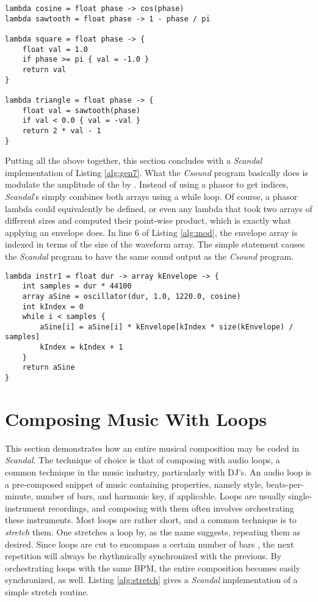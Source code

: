 \begin{lstlisting}[emph={lambda,float,cos,pi,if,return},emphstyle={\textbf},caption={Waveform-generating lambdas.},label={alg:waveforms}]
lambda cosine = float phase -> cos(phase)
lambda sawtooth = float phase -> 1 - phase / pi

lambda square = float phase -> {
	float val = 1.0
	if phase >= pi { val = -1.0 }
	return val
}

lambda triangle = float phase -> {
	float val = sawtooth(phase)
	if val < 0.0 { val = -val }
	return 2 * val - 1
}
\end{lstlisting}

Putting all the above together, this section concludes with a \emph{Scandal} implementation of Listing \ref{alg:gen7}. What the \emph{Csound} program basically does is modulate the amplitude of the  by . Instead of using a phasor to get indices, \emph{Scandal}'s  simply combines both arrays using a while loop. Of course, a phasor lambda could equivalently be defined, or even any lambda that took two arrays of different sizes and computed their point-wise product, which is exactly what applying an envelope does. In line 6 of Listing \ref{alg:mod}, the envelope array is indexed in terms of the size of the waveform array. The simple statement  causes the \emph{Scandal} program to have the same sound output as the \emph{Csound} program.

\begin{lstlisting}[emph={lambda,float,array,int,while,return},emphstyle={\textbf},caption={Implementing a \emph{Csound} program in \emph{Scandal}.},label={alg:mod}]
lambda instr1 = float dur -> array kEnvelope -> {
	int samples = dur * 44100
	array aSine = oscillator(dur, 1.0, 1220.0, cosine)
	int kIndex = 0
	while i < samples {
		aSine[i] = aSine[i] * kEnvelope[kIndex * size(kEnvelope) / samples]
		kIndex = kIndex + 1
	}
	return aSine
}
\end{lstlisting}

\section{Composing Music With Loops}

This section demonstrates how an entire musical composition may be coded in \emph{Scandal}. The technique of choice is that of composing with audio loops, a common technique in the music industry, particularly with DJ's. An audio loop is a pre-composed snippet of music containing properties, namely style, beats-per-minute, number of bars, and harmonic key, if applicable. Loops are usually single-instrument recordings, and composing with them often involves orchestrating these instruments. Most loops are rather short, and a common technique is to \emph{stretch} them. One stretches a loop by, as the name suggests, repeating them as desired. Since loops are cut to encompass a certain number of bars , the next repetition will always be rhythmically synchronized with the previous. By orchestrating loops with the same BPM, the entire composition becomes easily synchronized, as well. Listing \ref{alg:stretch} gives a \emph{Scandal} implementation of a simple stretch routine.

